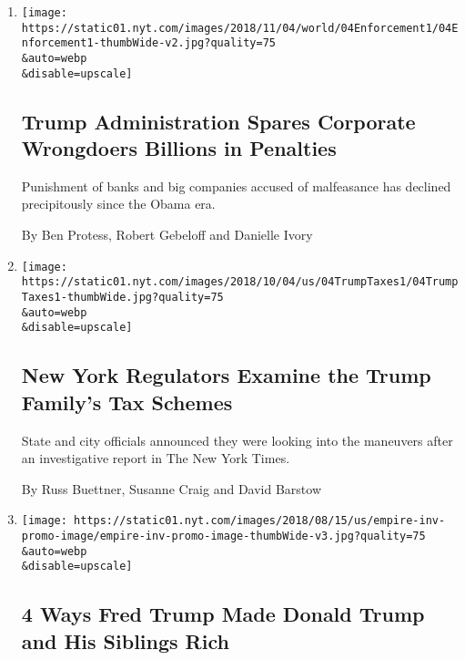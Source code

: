 \begin{enumerate}
\def\labelenumi{\arabic{enumi}.}
\item
  \href{/2018/11/03/us/trump-sec-doj-corporate-penalties.html}{}

  \texttt{[image: https://static01.nyt.com/images/2018/11/04/world/04Enforcement1/04Enforcement1-thumbWide-v2.jpg?quality=75\\\&auto=webp\\\&disable=upscale]}

  \hypertarget{trump-administration-spares-corporate-wrongdoers-billions-in-penalties}{%
  \subsection{Trump Administration Spares Corporate Wrongdoers Billions
  in
  Penalties}\label{trump-administration-spares-corporate-wrongdoers-billions-in-penalties}}

  Punishment of banks and big companies accused of malfeasance has
  declined precipitously since the Obama era.

  By Ben Protess, Robert Gebeloff and Danielle Ivory
\item
  \href{/2018/10/04/us/politics/donald-trump-fred-trump-tax-schemes.html}{}

  \texttt{[image: https://static01.nyt.com/images/2018/10/04/us/04TrumpTaxes1/04TrumpTaxes1-thumbWide.jpg?quality=75\\\&auto=webp\\\&disable=upscale]}

  \hypertarget{new-york-regulators-examine-the-trump-familys-tax-schemes}{%
  \subsection{New York Regulators Examine the Trump Family's Tax
  Schemes}\label{new-york-regulators-examine-the-trump-familys-tax-schemes}}

  State and city officials announced they were looking into the
  maneuvers after an investigative report in The New York Times.

  By Russ Buettner, Susanne Craig and David Barstow
\item
  \href{/interactive/2018/10/02/us/politics/trump-family-wealth.html}{}

  \texttt{[image: https://static01.nyt.com/images/2018/08/15/us/empire-inv-promo-image/empire-inv-promo-image-thumbWide-v3.jpg?quality=75\\\&auto=webp\\\&disable=upscale]}

  \hypertarget{4-ways-fred-trump-made-donald-trump-and-his-siblings-rich}{%
  \subsection{4 Ways Fred Trump Made Donald Trump and His Siblings
  Rich}\label{4-ways-fred-trump-made-donald-trump-and-his-siblings-rich}}


\end{enumerate}
